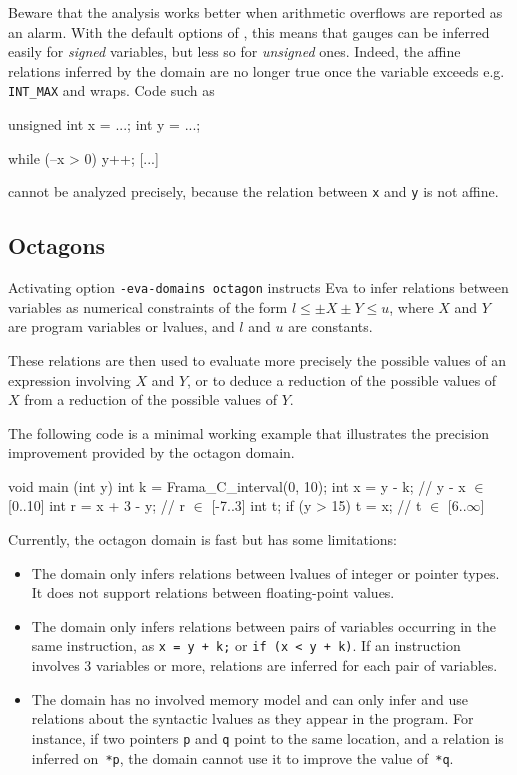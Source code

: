 \documentclass{frama-c-book}
\begin{document}
Beware that the analysis works better when arithmetic overflows
are reported as an alarm. With the default options of \FramaC,
this means that gauges can be inferred easily for \emph{signed}
variables, but less so for \emph{unsigned} ones. Indeed, the affine
relations inferred by the domain are no longer true once the
variable exceeds e.g. \texttt{INT\_MAX} and wraps. Code such as
\begin{listing-nonumber}
unsigned int x = ...;
int y = ...;

while (--x > 0) {
  y++;
  [...]
}
\end{listing-nonumber}
 cannot be analyzed precisely, because the relation between \texttt{x}
and \texttt{y} is not affine.


\subsection{Octagons}
\label{sec:octagons}

Activating option \texttt{-eva-domains octagon} instructs Eva to infer relations
between variables as numerical constraints of the form $l \leq \pm X \pm Y \leq
u$, where $X$ and $Y$ are program variables or lvalues,
and $l$ and $u$ are constants.

These relations are then used to evaluate more precisely the possible values
of an expression involving $X$ and $Y$, or to deduce a reduction of
the possible values of $X$ from a reduction of the possible values of $Y$.

The following code is a minimal working example that illustrates
the precision improvement provided by the octagon domain.
\begin{listing-nonumber}
void main (int y) {
  int k = Frama_C_interval(0, 10);
  int x = y - k;               // y - x $\in$ [0..10]
  int r = x + 3 - y;           // r $\in$ [-7..3]
  int t;
  if (y > 15)
    t = x;                     // t $\in$ [6..$\infty$]
}
\end{listing-nonumber}


Currently, the octagon domain is fast but has some limitations:
\begin{itemize}
\item
  The domain only infers relations between lvalues of integer or
  pointer types.
  It does not support relations between floating-point values.
\item
  The domain only infers relations between pairs of variables occurring in the
  same instruction, as \lstinline|x = y + k;| or \lstinline|if (x < y + k)|.
  If an instruction involves 3 variables or more, relations are inferred for
  each pair of variables.
\item
  The domain has no involved memory model and can only infer and use relations
  about the syntactic lvalues as they appear in the program.
  For instance, if two pointers \lstinline|p| and \lstinline|q| point to the
  same location, and a relation is inferred on \lstinline|*p|, the domain cannot
  use it to improve the value of \lstinline|*q|.
\end{itemize}
\end{document}
